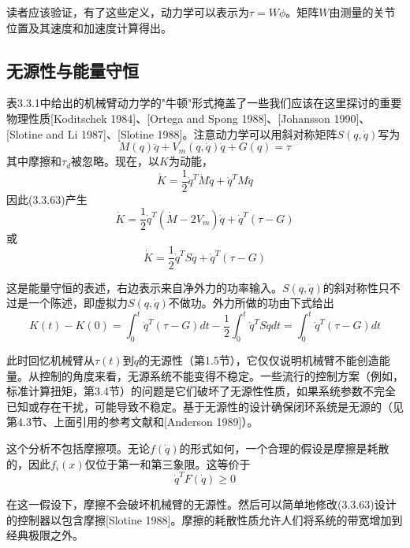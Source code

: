 \documentclass[12pt,a4paper]{ctexart}
\begin{document}
读者应该验证，有了这些定义，动力学可以表示为$\tau = W\phi$。矩阵$W$由测量的关节位置及其速度和加速度计算得出。

\subsection{无源性与能量守恒}

表3.3.1中给出的机械臂动力学的"牛顿"形式掩盖了一些我们应该在这里探讨的重要物理性质[Koditschek 1984]、[Ortega and Spong 1988]、[Johansson 1990]、[Slotine and Li 1987]、[Slotine 1988]。注意动力学可以用斜对称矩阵$S(q,\dot{q})$写为
\begin{equation}
M(q)\ddot{q} + V_m(q,\dot{q})\dot{q} + G(q) = \tau
\end{equation}
其中摩擦和$\tau_d$被忽略。现在，以$K$为动能，
\begin{equation}
\dot{K} = \frac{1}{2}\dot{q}^T\dot{M}\dot{q} + \dot{q}^T M\ddot{q}
\end{equation}
因此(3.3.63)产生
\begin{equation}
\dot{K} = \frac{1}{2}\dot{q}^T(\dot{M} - 2V_m)\dot{q} + \dot{q}^T(\tau - G)
\end{equation}
或
\begin{equation}
\dot{K} = \frac{1}{2}\dot{q}^T S \dot{q} + \dot{q}^T(\tau - G)
\end{equation}

这是能量守恒的表述，右边表示来自净外力的功率输入。$S(q,\dot{q})$的斜对称性只不过是一个陈述，即虚拟力$S(q,\dot{q})$不做功。外力所做的功由下式给出
\begin{equation}
K(t) - K(0) = \int_0^t \dot{q}^T(\tau - G) dt - \frac{1}{2}\int_0^t \dot{q}^T S \dot{q} dt = \int_0^t \dot{q}^T(\tau - G) dt
\end{equation}

此时回忆机械臂从$\tau(t)$到$\dot{q}$的无源性（第1.5节），它仅仅说明机械臂不能创造能量。从控制的角度来看，无源系统不能变得不稳定。一些流行的控制方案（例如，标准计算扭矩，第3.4节）的问题是它们破坏了无源性性质，如果系统参数不完全已知或存在干扰，可能导致不稳定。基于无源性的设计确保闭环系统是无源的（见第4.3节、上面引用的参考文献和[Anderson 1989]）。

这个分析不包括摩擦项。无论$f(\dot{q})$的形式如何，一个合理的假设是摩擦是耗散的，因此$f_i(x)$仅位于第一和第三象限。这等价于
\begin{equation}
\dot{q}^T F(\dot{q}) \geq 0
\end{equation}

在这一假设下，摩擦不会破坏机械臂的无源性。然后可以简单地修改(3.3.63)设计的控制器以包含摩擦[Slotine 1988]。摩擦的耗散性质允许人们将系统的带宽增加到经典极限之外。
\end{document}
